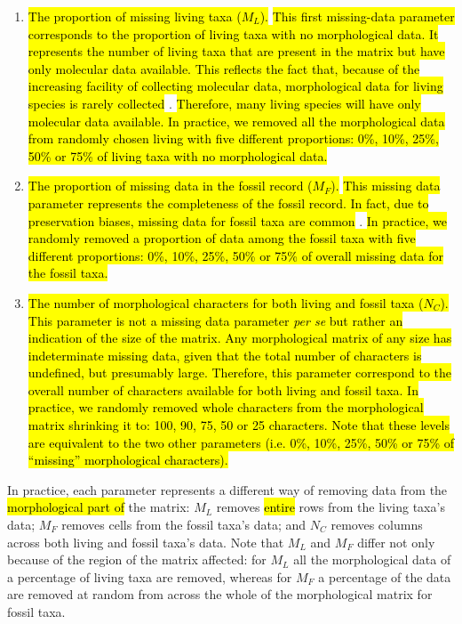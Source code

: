 \documentclass[12pt,letterpaper]{article}
\begin{document}
\begin{enumerate}
\item{\hl{The proportion of missing living taxa ($M_{L}$).}}
\hl{This first missing-data parameter corresponds to the proportion of living taxa with no morphological data.
It represents the number of living taxa that are present in the matrix but have only molecular data available.
This reflects the fact that, because of the increasing facility of collecting molecular data, morphological data for living species is rarely collected} \citep{GuillermeCooperMissing}. %
\hl{Therefore, many living species will have only molecular data available.
In practice, we removed all the morphological data from randomly chosen living with five different proportions: 0\%, 10\%, 25\%, 50\% or 75\% of living taxa with no morphological data.}
\item{\hl{The proportion of missing data in the fossil record ($M_{F}$).}}
\hl{This missing data parameter represents the completeness of the fossil record.
In fact, due to preservation biases, missing data for fossil taxa are common }\citep{sansomfossilization2013}. 
\hl{In practice, we randomly removed a proportion of data among the fossil taxa with five different proportions: 0\%, 10\%, 25\%, 50\% or 75\% of overall missing data for the fossil taxa.}
\item{\hl{The number of morphological characters for both living and fossil taxa ($N_{C}$).}}
\hl{This parameter is not a missing data parameter \textit{per se} but rather an indication of the size of the matrix.
Any morphological matrix of any size has indeterminate missing data, given that the total number of characters is undefined, but presumably large. %
Therefore, this parameter correspond to the overall number of characters available for both living and fossil taxa.
In practice, we randomly removed whole characters from the morphological matrix shrinking it to: 100, 90, 75, 50 or 25 characters.
Note that these levels are equivalent to the two other parameters (i.e. 0\%, 10\%, 25\%, 50\% or 75\% of ``missing'' morphological characters).}
\end{enumerate}

In practice, each parameter represents a different way of removing data from the \hl{morphological part of} the matrix: $M_L$ removes \hl{entire} rows from the living taxa's data; $M_F$ removes cells from the fossil taxa's data; and $N_C$ removes columns across both living and fossil taxa's data.
Note that $M_L$ and $M_F$ differ not only because of the region of the matrix affected: for $M_L$ all the morphological data of a percentage of living taxa are removed, whereas for $M_F$ a percentage of the data are removed at random from across the whole of the morphological matrix for fossil taxa.
\end{document}

